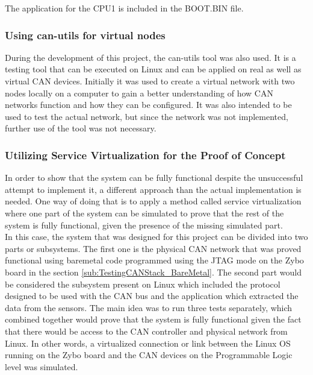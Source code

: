 The application for the CPU1 is included in the BOOT.BIN file.

\subsubsection{Using can-utils for virtual nodes}

During the development of this project, the can-utils tool was also used.
It is a testing tool that can be executed on Linux and can be applied on real as well as virtual CAN devices.
Initially it was used to create a virtual network with two nodes locally on a computer to gain a better understanding of how CAN networks function and how they can be configured.
It was also intended to be used to test the actual network, but since the network was not implemented, further use of the tool was not necessary.

\subsubsection{Utilizing Service Virtualization for the Proof of Concept}
\label{sub:Utilizing_Svr_Virtualization}

In order to show that the system can be fully functional despite the unsuccessful attempt to implement it, a different approach than the actual implementation is needed.
One way of doing that is to apply a method called service virtualization where one part of the system can be simulated to prove that the rest of the system is fully functional, given the presence of the missing simulated part.
\\
In this case, the system that was designed for this project can be divided into two parts or subsystems.
The first one is the physical CAN network that was proved functional using bare\-metal code programmed using the JTAG mode   on the Zybo board in the section \ref{sub:TestingCANStack_BareMetal}.
The second part would be considered the subsystem present on Linux which included the protocol designed to be used with the CAN bus and the application which extracted the data from the sensors.
The main idea was to run three tests separately, which combined together would prove that the system is fully functional given the fact that there would be access to the CAN controller and physical network from Linux. In other words, a virtualized connection or link between the Linux OS running on the Zybo board and the CAN devices on the Programmable Logic level  was simulated.
